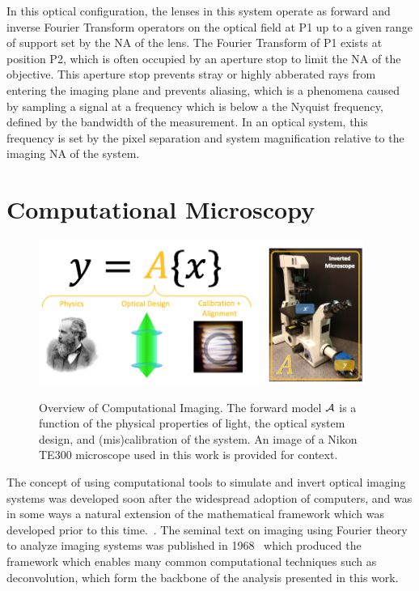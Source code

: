 In this optical configuration, the lenses in this system operate as forward and inverse Fourier Transform operators on the optical field at P1 up to a given range of support set by the NA of the lens. The Fourier Transform of P1 exists at position P2, which is often occupied by an aperture stop to limit the NA of the objective. This aperture stop prevents stray or highly abberated rays from entering the imaging plane and prevents aliasing, which is a phenomena caused by sampling a signal at a frequency which is below a the Nyquist frequency, defined by the bandwidth of the measurement. In an optical system, this frequency is set by the pixel separation and system magnification relative to the imaging NA of the system.

\section{Computational Microscopy}

\begin{figure}
    \centering
    \includegraphics[width=0.95\textwidth]{figures/fig_intro_comp_imaging.png}
    \label{fig:intro_overview}
    \caption{Overview of Computational Imaging. The forward model $\mathcal{A}$ is a function of the physical properties of light, the optical system design, and (mis)calibration of the system. An image of a Nikon TE300 microscope used in this work is provided for context.}
\end{figure}

The concept of using computational tools to simulate and invert optical imaging systems was developed soon after the widespread adoption of computers, and was in some ways a natural extension of the mathematical framework which was developed prior to this time.~\cite{bracewell1986fourier}. The seminal text on imaging using Fourier theory to analyze imaging systems was published in 1968~\cite{goodman:68} which produced the framework which enables many common computational techniques such as deconvolution, which form the backbone of the analysis presented in this work.

